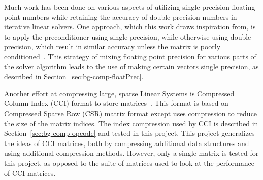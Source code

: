 Much work has been done on various aspects of utilizing single precision floating point numbers while retaining the accuracy of double precision numbers in iterative linear solvers.
One approach, which this work draws inspiration from, is to apply the preconditioner using single precision, while otherwise using double precision, which result in similar accuracy unless the matrix is poorly conditioned~\cite{Buttari:2008:mixedPrec, Hogg:2010:multiplePasses}.
This strategy of mixing floating point precision for various parts of the solver algorithm leads to the use of making certain vectors single precision, as described in Section~\ref{sec:bg-comp-floatPrec}.

Another effort at compressing large, sparse Linear Systems is Compressed Column Index (CCI) format to store matrices~\cite{Lawlor:2013:compression}.
This format is based on Compressed Sparse Row (CSR) matrix format except uses compression to reduce the size of the matrix indices.
The index compression used by CCI is described in Section~\ref{sec:bg-comp-opcode} and tested in this project.
This project generalizes the ideas of CCI matrices, both by compressing additional data structures and using additional compression methods.
However, only a single matrix is tested for this project, as opposed to the suite of matrices used to look at the performance of CCI matrices.